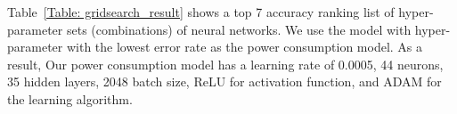 \documentclass[journal]{./template/IEEEtran}
\begin{document}
\begin{table}[ht]
\caption{The list of grid search results}
\label{Table: gridsearch_result}
\end{table}

Table~\ref{Table: gridsearch_result} shows a top 7 accuracy ranking list of hyper-parameter sets (combinations) of neural networks.
We use the model with hyper-parameter with the lowest error rate as the power consumption model. As a result, Our power consumption model has a learning rate of 0.0005, 44 neurons, 35 hidden layers, 2048 batch size, ReLU for activation function, and ADAM for the learning algorithm. 

\end{document}
